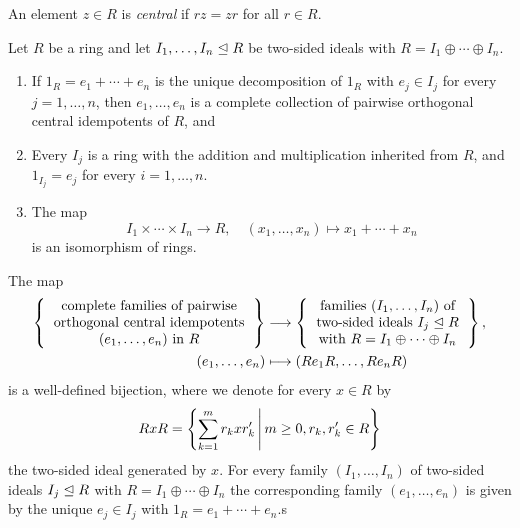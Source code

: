 \begin{definition}
  An element $z \in R$ is \emph{central} if $rz = zr$ for all $r \in R$.
\end{definition}


\begin{proposition}
  \label{proposition: factor ideals are again rings}
  Let $R$ be a ring and let $I_1, \dotsc, I_n \trianglelefteq R$ be two-sided ideals with $R = I_1 \oplus \dotsb \oplus I_n$.
  \begin{enumerate}
    \item
      If $1_R = e_1 + \dotsb + e_n$ is the unique decomposition of $1_R$ with $e_j \in I_j$ for every $j = 1, \dotsc, n$, then $e_1, \dotsc, e_n$ is a complete collection of pairwise orthogonal central idempotents of $R$, and 
    \item
      Every $I_j$ is a ring with the addition and multiplication inherited from $R$, and $1_{I_j} = e_j$ for every $i = 1, \dotsc, n$.
    \item
      The map
      \[
            I_1 \times \dotsb \times I_n
        \to R,
        \quad   (x_1, \dotsc, x_n)
        \mapsto x_1 + \dotsb + x_n
      \]
      is an isomorphism of rings.
  \end{enumerate}
\end{proposition}


\begin{theorem}
  \label{theorem: correspondence central idempotents and direct decompositions}
  The map
  \begin{align*}
    \left\{
      \begin{tabular}{c}
        complete families of pairwise \\
        orthogonal central idempotents  \\
        $(e_1, \dotsc, e_n)$ in $R$
      \end{tabular}
    \right\}
    &\longto
      \left\{
      \begin{tabular}{c}
        families $(I_1, \dotsc, I_n)$ of  \\
        two-sided ideals $I_j \idealeq R$ \\
        with $R = I_1 \oplus \dotsb \oplus I_n$
      \end{tabular}
      \right\},
    \\
                  (e_1, \dotsc, e_n)
    &\longmapsto  (R e_1 R, \dotsc, R e_n R)
  \end{align*}
  is a well-defined bijection, where we denote for every $x \in R$ by
  \[
      R x R
    = \left\{
        \sum_{k=1}^m r_k x r'_k
      \suchthat*
        m \geq 0,
        r_k, r'_k \in R
      \right\}
  \]
  the two-sided ideal generated by $x$.
  For every family  $(I_1, \dotsc, I_n)$ of two-sided ideals $I_j \trianglelefteq R$ with $R = I_1 \oplus \dotsb \oplus I_n$ the corresponding family $(e_1, \dotsc, e_n)$ is given by the unique $e_j \in I_j$ with $1_R = e_1 + \dotsb + e_n$.s
\end{theorem}




